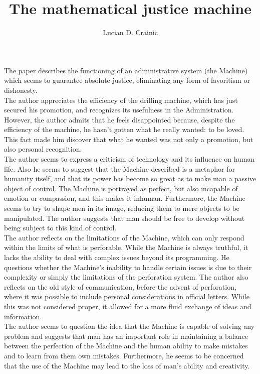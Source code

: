 \documentclass{homework}
\title{The mathematical justice machine}
\author{Lucian D. Crainic}
\begin{document}
\maketitle
The paper describes the functioning of an administrative system (the Machine) 
which seems to guarantee absolute justice, eliminating any form of favoritism or 
dishonesty. \\
The author appreciates the efficiency of the drilling machine, which 
has just secured his promotion, and recognizes its usefulness in the Administration.
However, the author admits that he feels disappointed 
because, despite the efficiency of the machine, he hasn't gotten what he really 
wanted: to be loved. This fact made him discover that what he wanted was not only
a promotion, but also personal recognition. \\
The author seems to express a criticism of technology and its influence on human 
life. Also he seems to suggest that the Machine described is a metaphor for 
humanity itself, and that its power has become so great as to make man a passive 
object of control. The Machine is portrayed as perfect, but also incapable of 
emotion or compassion, and this makes it inhuman. Furthermore, the Machine seems 
to try to shape men in its image, reducing them to mere objects to be manipulated.
The author suggests that man should be free to develop without being subject to 
this kind of control.\\
The author reflects on the limitations of the Machine, which can only respond within 
the limits of what is perforable. While the Machine is always truthful, it lacks 
the ability to deal with complex issues beyond its programming. He questions 
whether the Machine's inability to handle certain issues is due to their complexity 
or simply the limitations of the perforation system.
The author also reflects on the old style of communication, before the advent of 
perforation, where it was possible to include personal considerations in official 
letters. While this was not considered proper, it allowed for a more fluid exchange 
of ideas and information.\\
The author seems to question the idea that the Machine is capable of solving any 
problem and suggests that man has an important role in maintaining a balance between 
the perfection of the Machine and the human ability to make mistakes and to learn from them own mistakes. 
Furthermore, he seems to be concerned that the use of the Machine may 
lead to the loss of man's ability and creativity. \\
\end{document}
